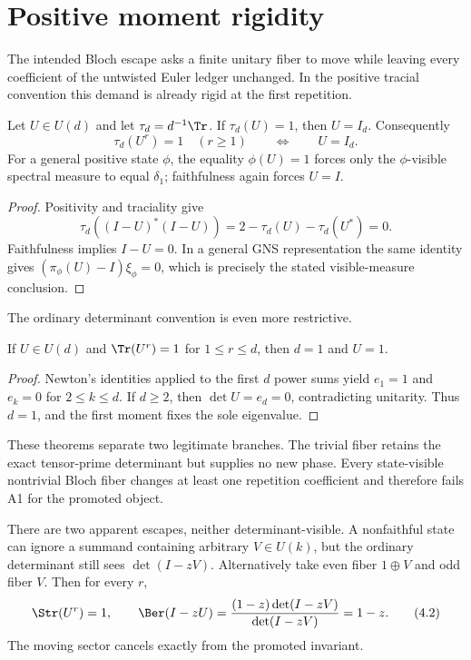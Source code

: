 \section{Positive moment rigidity}
\label{sec:rigidity}

The intended Bloch escape asks a finite unitary fiber to move while leaving
every coefficient of the untwisted Euler ledger unchanged.  In the positive
tracial convention this demand is already rigid at the first repetition.

\begin{theorem}
\label{thm:positive-rigidity}
Let $U\in U(d)$ and let $\tau_d=d^{-1}\Tr$.  If $\tau_d(U)=1$, then
$U=I_d$.  Consequently
\[
 \tau_d(U^r)=1\quad(r\geq1)
 \qquad\Longleftrightarrow\qquad U=I_d .                 \tag{4.1}
\]
For a general positive state $\phi$, the equality $\phi(U)=1$ forces only
the $\phi$-visible spectral measure to equal $\delta_1$; faithfulness again
forces $U=I$.
\end{theorem}

\begin{proof}
Positivity and traciality give
\[
 \tau_d((I-U)^*(I-U))=2-\tau_d(U)-\tau_d(U^*)=0.
\]
Faithfulness implies $I-U=0$.  In a general GNS representation the same
identity gives $(\pi_\phi(U)-I)\xi_\phi=0$, which is precisely the stated
visible-measure conclusion.
\end{proof}

The ordinary determinant convention is even more restrictive.

\begin{theorem}
\label{thm:ordinary-rigidity}
If $U\in U(d)$ and $\Tr(U^r)=1$ for $1\leq r\leq d$, then $d=1$ and
$U=1$.
\end{theorem}

\begin{proof}
Newton's identities applied to the first $d$ power sums yield $e_1=1$ and
$e_k=0$ for $2\leq k\leq d$.  If $d\geq2$, then
$\det U=e_d=0$, contradicting unitarity.  Thus $d=1$, and the first moment
fixes the sole eigenvalue.
\end{proof}

These theorems separate two legitimate branches.  The trivial fiber retains
the exact tensor-prime determinant but supplies no new phase.  Every
state-visible nontrivial Bloch fiber changes at least one repetition
coefficient and therefore fails A1 for the promoted object.

There are two apparent escapes, neither determinant-visible.  A nonfaithful
state can ignore a summand containing arbitrary $V\in U(k)$, but the ordinary
determinant still sees $\det(I-zV)$.  Alternatively take even fiber
$1\oplus V$ and odd fiber $V$.  Then for every $r$,
\[
 \Str(U^r)=1,
 \qquad
 \Ber(I-zU)=\frac{(1-z)\det(I-zV)}{\det(I-zV)}=1-z.       \tag{4.2}
\]
The moving sector cancels exactly from the promoted invariant.
